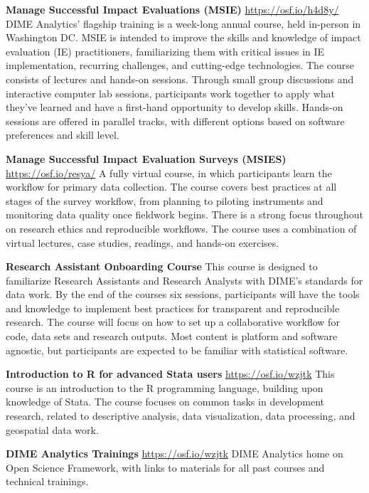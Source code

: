 \textbf{Manage Successful Impact Evaluations (MSIE)}
\url{https://osf.io/h4d8y/}
DIME Analytics’ flagship training is a week-long annual course, held in-person in Washington DC. MSIE is intended to improve the skills and knowledge of impact evaluation (IE) practitioners, familiarizing them with critical issues in IE implementation, recurring challenges, and cutting-edge technologies. The course consists of lectures and hands-on sessions. Through small group discussions and interactive computer lab sessions, participants work together to apply what they’ve learned and have a first-hand opportunity to develop skills. Hands-on sessions are offered in parallel tracks, with different options based on software preferences and skill level.

\textbf{Manage Successful Impact Evaluation Surveys (MSIES)}
\url{https://osf.io/resya/}
A fully virtual course, in which participants learn the workflow for primary data collection. The course covers best practices at all stages of the survey workflow, from planning to piloting instruments and monitoring data quality once fieldwork begins. There is a strong focus throughout on research ethics and reproducible workflows. The course uses a combination of virtual lectures, case studies, readings, and hands-on exercises.

\textbf{Research Assistant Onboarding Course}
This course is designed to familiarize Research Assistants and Research Analysts with DIME’s standards for data work. By the end of the courses six sessions, participants will have the tools and knowledge to implement best practices for transparent and reproducible research. The course will focus on how to set up a collaborative workflow for code, data sets and research outputs. Most content is platform and software agnostic, but participants are expected to be familiar with statistical software.

\textbf{Introduction to R for advanced Stata users}
\url{https://osf.io/wzjtk}
This course is an introduction to the R programming language, building upon knowledge of Stata. The course focuses on common tasks in development research, related to descriptive analysis, data visualization, data processing, and geospatial data work. 

\textbf{DIME Analytics Trainings}
\url{https://osf.io/wzjtk}
DIME Analytics home on Open Science Framework, with links to materials for all past courses and technical trainings. 


